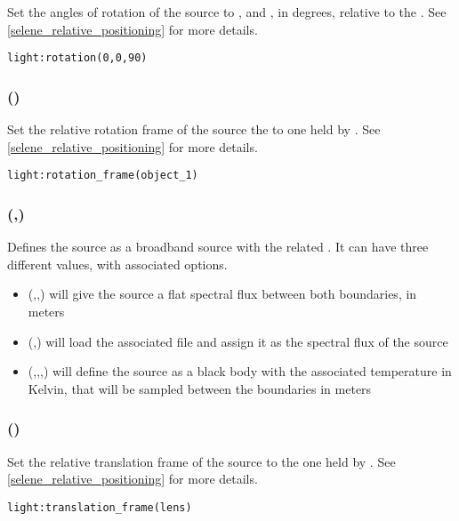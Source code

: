 Set the angles of rotation of the source to \lft{$\alpha$}, \lft{$\beta$} and \lft{$\gamma$}, in degrees, relative to the . See \ref{selene_relative_positioning} for more details.
\begin{lstlisting}
light:rotation(0,0,90)
\end{lstlisting}

\subsubsection[rotation\_frame]{()}

Set the relative rotation frame of the source the to one held by . See \ref{selene_relative_positioning} for more details.
\begin{lstlisting}
light:rotation_frame(object_1)
\end{lstlisting}

\subsubsection[spectrum]{(,)}

Defines the source as a broadband source with the related . It can have three different values, with associated options.
\begin{itemize}
	\item {}(,,) will give the source a flat spectral flux between both boundaries, in meters
	\item {}(,) will load the associated file and assign it as the spectral flux of the source
	\item {}(,,,) will define the source as a black body with the associated temperature in Kelvin, that will be sampled between the boundaries in meters
\end{itemize}

\subsubsection[translation\_frame]{()}

Set the relative translation frame of the source to the one held by . See \ref{selene_relative_positioning} for more details.
\begin{lstlisting}
light:translation_frame(lens)
\end{lstlisting}

